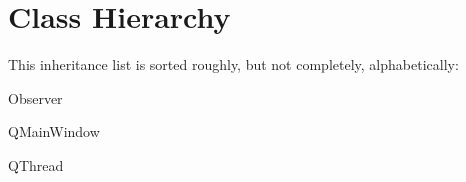 \section{Class Hierarchy}
This inheritance list is sorted roughly, but not completely, alphabetically\-:\begin{DoxyCompactList}
\item Observer\begin{DoxyCompactList}
\item {}
\item {}
\end{DoxyCompactList}
\item {}
\item Q\-Main\-Window\begin{DoxyCompactList}
\item {}
\end{DoxyCompactList}
\item Q\-Thread\begin{DoxyCompactList}
\item {}
\end{DoxyCompactList}
\end{DoxyCompactList}
